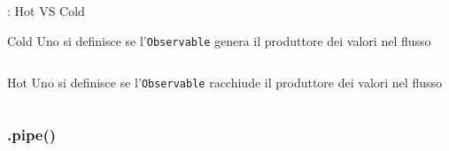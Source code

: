             \begin{frame}{\insertsubsectionhead}{\insertsubsubsectionhead: Hot VS Cold}


                \begin{block}{Cold}
                    Uno  si definisce \textbf{} se l'\texttt{Observable} genera il produttore dei valori nel flusso
                \end{block}
                \inputminted{js}{src/cold_observable.js}

                \pause

                \begin{block}{Hot}
                    Uno  si definisce \textbf{} se l'\texttt{Observable} racchiude il produttore dei valori nel flusso
                \end{block}
                \inputminted{js}{src/hot_observable.js}
            \end{frame}

            \subsubsection{.pipe()}\label{subsub:pipe}

